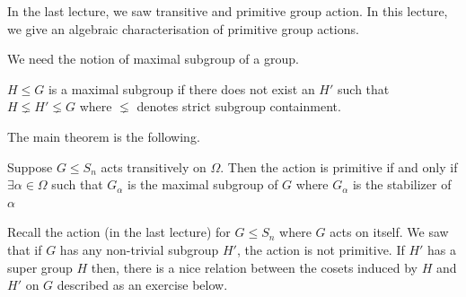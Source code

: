 
In the last lecture, we saw transitive and primitive group action. In this
lecture, we give an algebraic characterisation of primitive group actions.

We need the notion of maximal subgroup of a group.
\begin{definition}
$H \leq G$ is a maximal subgroup if there does not exist an $H'$ such that 
$H \lneq H' \lneq G$ where $\lneq$ denotes strict subgroup containment.
\end{definition}

The main theorem is the following.
\begin{theorem}
	Suppose $G \le S_n$ acts transitively on $\Omega$. Then the action is
	primitive if and only if $\exists \alpha \in \Omega$ such that
	$G_{\alpha}$ is the maximal subgroup of $G$ where $G_\alpha$ is the
	stabilizer of $\alpha$
	\label{thm:primitive-action}
\end{theorem}

Recall the action (in the last lecture) for $G \le S_n$ where $G$ acts on
itself. We saw that if $G$ has any non-trivial subgroup $H'$, the action is
not primitive. If $H'$ has a super group $H$ then, there is a nice relation
between the cosets induced by $H$ and $H'$ on $G$ described as an exercise
below.

